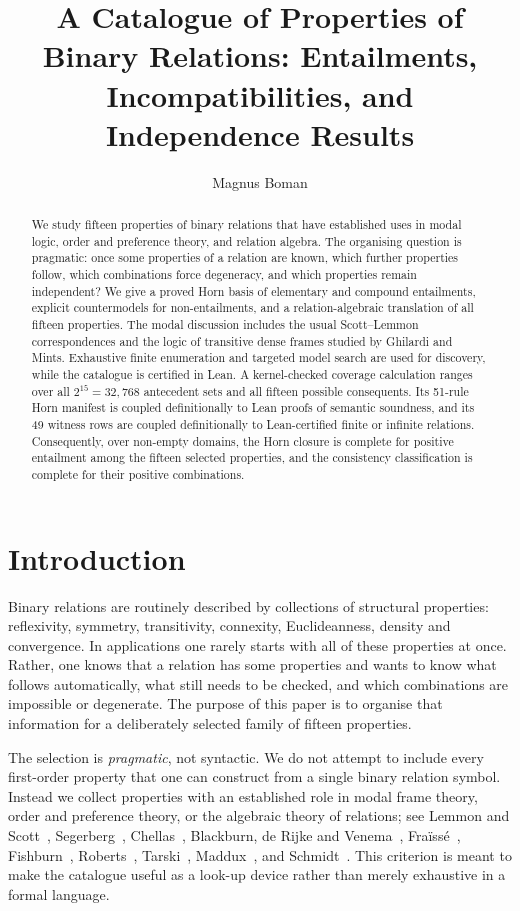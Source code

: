 \documentclass[11pt,a4paper,reqno]{amsart}
\title[A Catalogue of Properties of Binary Relations]{A Catalogue of Properties of Binary Relations: Entailments, Incompatibilities, and Independence Results}
\author{Magnus Boman}
\theoremstyle{definition}
\theoremstyle{remark}
\begin{document}
\begin{abstract}
We study fifteen properties of binary relations that have established uses in
modal logic, order and preference theory, and relation algebra.  The organising
question is pragmatic: once some properties of a relation are known, which
further properties follow, which combinations force degeneracy, and which
properties remain independent?  We give a proved Horn basis of elementary and
compound entailments, explicit countermodels for non-entailments, and a
relation-algebraic translation of all fifteen properties.  The modal discussion
includes the usual Scott--Lemmon correspondences and the logic of transitive
dense frames studied by Ghilardi and Mints.  Exhaustive finite enumeration and
targeted model search are used for discovery, while the catalogue is
certified in Lean.  A kernel-checked coverage calculation ranges over all
$2^{15}=32{,}768$ antecedent sets and all fifteen possible consequents.  Its
51-rule Horn manifest is coupled definitionally to Lean proofs of semantic
soundness, and its 49 witness rows are coupled definitionally to Lean-certified
finite or infinite relations.  Consequently, over non-empty domains, the Horn
closure is complete for positive entailment among the fifteen selected
properties, and the consistency classification is complete for their positive
combinations.
\end{abstract}

\maketitle

\section{Introduction}

Binary relations are routinely described by collections of structural
properties: reflexivity, symmetry, transitivity, connexity, Euclideanness,
density and convergence.  In applications one rarely starts with all
of these properties at once.  Rather, one knows that a relation has some
properties and wants to know what follows automatically, what still needs to
be checked, and which combinations are impossible or degenerate.  The purpose
of this paper is to organise that information for a deliberately selected
family of fifteen properties.

The selection is \emph{pragmatic}, not syntactic.  We do not attempt to include
every first-order property that one can construct from a single binary
relation symbol.  Instead we collect properties with an established role in
modal frame theory, order and preference theory, or the algebraic theory of
relations; see Lemmon and Scott~\cite{LemmonScott1977}, Segerberg~\cite{Segerberg1971},
Chellas~\cite{Chellas1980}, Blackburn, de Rijke and Venema~\cite{BlackburnEtAl2001},
Fra\"iss\'e~\cite{Fraisse}, Fishburn~\cite[Chs.~1--2]{Fishburn1970},
Roberts~\cite[Ch.~2]{Roberts1979}, Tarski~\cite{Tarski1941},
Maddux~\cite{Maddux1978,Maddux}, and Schmidt~\cite{Schmidt2010}.  This criterion is meant
to make the catalogue useful as a look-up device rather than merely exhaustive
in a formal language.
\end{document}
